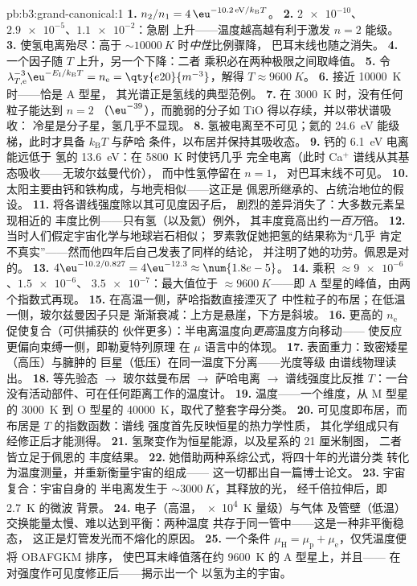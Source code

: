 \begin{solution}{pb:b3:grand-canonical:1}
\textbf{1.} $n_2/n_1 = 4\,\eu^{-10.2\,\text{eV}/k_{\text{B}}T}$。
\textbf{2.} $\num{2e-10}$、$\num{2.9e-5}$、$\num{1.1e-2}$：急剧
上升——温度越高越有利于激发 $n = 2$ 能级。
\textbf{3.} 使氢电离殆尽：高于
$\sim\qty{10000}{K}$ 时\emph{中性}比例骤降，
巴耳末线也随之消失。
\textbf{4.} 一个因子随 $T$ 上升，另一个下降：二者
乘积必在两种极限之间取峰值。
\textbf{5.} 令 $\lambda_{T,\text{e}}^{-3}\eu^{-E_{\text{I}}/
k_{\text{B}}T} = n_{\text{e}} = \qty{e20}{m^{-3}}$，解得 $T
\approx \qty{9600}{K}$。
\textbf{6.} 接近 \qty{10000}{K} 时——恰是 A 型星，
其光谱正是氢线的典型范例。
\textbf{7.} 在 \qty{3000}{K} 时，没有任何粒子能达到 $n = 2$
（$\eu^{-39}$），而脆弱的分子如 TiO 得以存续，并以带状谱吸收：
冷星是分子星，氢几乎不显现。
\textbf{8.} 氢被电离至不可见；氦的
\qty{24.6}{eV} 能级梯，此时才具备 $k_{\text{B}}T$ 与萨哈
条件，以布居并保持其吸收态。
\textbf{9.} 钙的 \qty{6.1}{eV} 电离能远低于
氢的 \qty{13.6}{eV}：在 \qty{5800}{K} 时使钙几乎
完全电离（此时 Ca$^+$ 谱线从其基态吸收——无玻尔兹曼代价），
而中性氢停留在 $n = 1$，
对巴耳末线不可见。
\textbf{10.} 太阳主要由钙和铁构成，与地壳相似——这正是
佩恩所继承的、占统治地位的假设。
\textbf{11.} 将各谱线强度除以其可见度因子后，
剧烈的差异消失了：大多数元素呈现相近的
丰度比例——只有氢（以及氦）例外，
其丰度竟高出约\emph{一百万}倍。
\textbf{12.} 当时人们假定宇宙化学与地球岩石相似；
罗素敦促她把氢的结果称为“几乎
肯定不真实”——然而他四年后自己发表了同样的结论，
并注明了她的功劳。佩恩是对的。
\textbf{13.} $4\eu^{-10.2/0.827} = 4\eu^{-12.3} \approx
\num{1.8e-5}$。
\textbf{14.} 乘积 $\approx \num{9e-6}$、$\num{1.5e-6}$、
$\num{3.5e-7}$：最大值位于 $\approx\qty{9600}{K}$——即
A 型星的峰值，由两个指数式再现。
\textbf{15.} 在高温一侧，萨哈指数直接湮灭了
中性粒子的布居；在低温一侧，玻尔兹曼因子只是
渐渐衰减：上方是悬崖，下方是斜坡。
\textbf{16.} 更高的 $n_{\text{e}}$ 促使复合（可供捕获的
伙伴更多）：半电离温度向\emph{更高}温度方向移动——
使反应更偏向束缚一侧，即勒夏特列原理
在 $\mu$ 语言中的体现。
\textbf{17.} 表面重力：致密矮星（高压）与臃肿的
巨星（低压）在同一温度下分离——光度等级
由谱线物理读出。
\textbf{18.} 等先验态 $\to$ 玻尔兹曼布居
$\to$ 萨哈电离 $\to$ 谱线强度比反推
$T$：一台没有活动部件、可在任何距离工作的温度计。
\textbf{19.} 温度——一个维度，从 M 型星的 \qty{3000}{K}
到 O 型星的 \qty{40000}{K}，取代了整套字母分类。
\textbf{20.} 可见度即布居，而布居是 $T$ 的指数函数：谱线
强度首先反映恒星的热力学性质，
其化学组成只有
经修正后才能测得。
\textbf{21.} 氢聚变作为恒星能源，以及星系的 21 厘米制图，
二者皆立足于佩恩的
丰度结果。
\textbf{22.} 她借助两种系综公式，将四十年的光谱分类
转化为温度测量，并重新衡量宇宙的组成——
这一切都出自一篇博士论文。
\textbf{23.} 宇宙复合：宇宙自身的
半电离发生于 $\sim\qty{3000}{K}$，其释放的光，
经千倍拉伸后，即 \qty{2.7}{K} 的微波
背景。
\textbf{24.} 电子（高温，\qty{e4}{K} 量级）与气体
及管壁（低温）交换能量太慢、难以达到平衡：两种温度
共存于同一管中——这是一种非平衡稳态，
这正是灯管发光而不熔化的原因。
\textbf{25.} 一个条件 $\mu_{\text{H}} = \mu_{\text{p}} +
\mu_{\text{e}}$，仅凭温度便将 OBAFGKM 排序，
使巴耳末峰值落在约 \qty{9600}{K} 的 A 型星上，并且——
在对强度作可见度修正后——揭示出一个
以氢为主的宇宙。
\end{solution}

